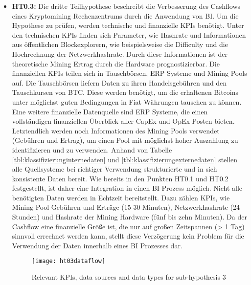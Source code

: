 \begin{itemize}
    \item \textbf{\ac{HT0.3}: }Die dritte Teilhypothese beschreibt die Verbesserung des Cashflows eines Kryptomining
    Rechenzentrums durch die Anwendung von \ac{BI}. Um die Hypothese zu prüfen, werden technische und finanzielle \acp{KPI}
    benötigt. Unter den technischen \acp{KPI} finden sich Parameter, wie Hashrate und Informationen aus öffentlichen
    Blockexplorern, wie beispielsweise die Difficulty und die Hochrechnung der Netzwerkhashrate. Durch diese Informationen ist
    der theoretische Mining Ertrag durch die Hardware prognostizierbar. Die finanziellen \acp{KPI} teilen sich in Tauschbörsen,
    \ac{ERP} Systeme und Mining Pools auf. Die Tauschbörsen liefern Daten zu ihren Handelsgebühren und den Tauschkursen von
    \ac{BTC}. Diese werden benötigt, um die erhaltenen Bitcoins unter möglichst guten Bedingungen in Fiat Währungen tauschen
    zu können. Eine weitere finanzielle Datenquelle sind \ac{ERP} Systeme, die einen vollständigen finanziellen Überblick
    aller \ac{CapEx} und \ac{OpEx} Posten bieten. Letztendlich werden noch Informationen des Mining Pools verwendet (Gebühren
    und Ertrag), um einen Pool mit möglichst hoher Auszahlung zu identifizieren und zu verwenden. Anhand von Tabelle
    \ref{tbl:klassifizierunginternedaten} und \ref{tbl:klassifizierungexternedaten} stellen alle Quellsysteme bei richtiger
    Verwendung strukturierte und in sich konsistente Daten bereit. Wie bereits in den Punkten \ac{HT0.1} und \ac{HT0.2}
    festgestellt, ist daher eine Integration in einen \ac{BI} Prozess möglich. Nicht alle benötigten Daten werden in Echtzeit
    bereitstellt. Dazu zählen \acp{KPI}, wie Mining Pool Gebühren und Erträge (15-30 Minuten), Netzwerkhashrate (24 Stunden)
    und Hashrate der Mining Hardware (fünf bis zehn Minuten). Da der Cashflow eine finanzielle Größe ist, die nur auf großen
    Zeitspannen (> 1 Tag) sinnvoll errechnet werden kann, stellt diese Verzögerung kein Problem für die Verwendung der Daten
    innerhalb eines \ac{BI} Prozesses dar.

    \begin{figure}[H]
        \caption{Relevant KPIs, data sources and data types for sub-hypothesis 3}
        \texttt{[image: ht03dataflow]}
        \label{figure:ht03dataflow}
    \end{figure}


\end{itemize}

